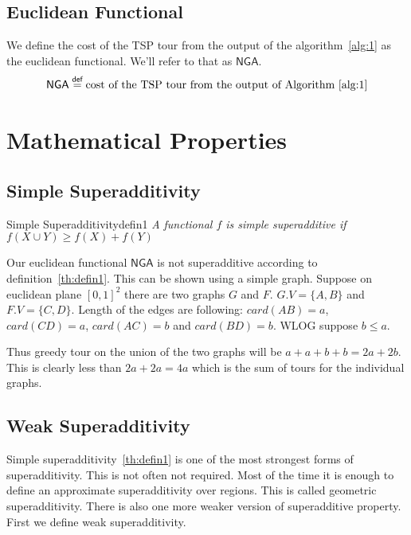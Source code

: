 \documentclass{article}
\begin{document}
\subsection{Euclidean Functional}
We define the cost of the TSP tour from the output of the algorithm~\ref{alg:1} as the euclidean functional.
We'll refer to that as $\textsf{NGA}$.
\begin{align*}
    \textsf{NGA} \stackrel{\textsf{def}}{=} \text{cost of the TSP tour from the output of Algorithm~\ref{alg:1}}
\end{align*}

\section{Mathematical Properties}


\subsection{Simple Superadditivity}

\begin{define}{Simple Superadditivity}{defin1}
    \textit{A functional $f$ is simple superadditive if $f(X \cup Y) \geq f(X) + f(Y)$}
\end{define}

Our euclidean functional $\textsf{NGA}$ is not superadditive according to
definition~\ref{th:defin1}. This can be shown using a simple graph. Suppose on
euclidean plane $[0, 1]^2$ there are two graphs $G$ and $F$. $G.V = \{A, B\}$
and $F.V = \{C, D\}$. Length of the edges are following: $card(AB) = a$,
$card(CD) = a$, $card(AC) = b$ and $card(BD) = b$. WLOG suppose $b \leq a$.

Thus greedy tour on the union of the two graphs will be $a + a + b + b = 2a +
    2b$. This is clearly less than $2a + 2a = 4a$ which is the sum of tours for the
individual graphs.


\subsection{Weak Superadditivity}

Simple superadditivity~\ref{th:defin1} is one of the most strongest forms of
superadditivity. This is not often not required. Most of the time it is enough
to define an approximate superadditivity over regions. This is called geometric
superadditivity. There is also one more weaker version of superadditive
property. First we define weak superadditivity.
\end{document}
